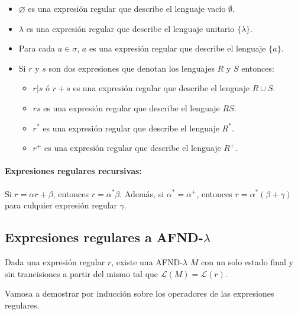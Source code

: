 \begin{itemize}
  \item \(\varnothing\) es una expresión regular que describe el lenguaje vacío \(\emptyset\).
  \item \(\lambda\) es una expresión regular que describe el lenguaje unitario \(\{\lambda\}\).
  \item Para cada \(a\in\sigma\), \(a\) es una expresión regular que describe el lenguaje \(\{a\}\).
  \item Si \(r\) y \(s\) son dos expresiones que denotan los lenguajes \(R\) y \(S\) entonces:
        \begin{itemize}
          \item \(r|s\) ó \(r+s\) es una expresión regular que describe el lenguaje \(R\cup S\).
          \item \(rs\) es una expresión regular que describe el lenguaje \(RS\).
          \item \(r^*\) es una expresión regular que describe el lenguaje \(R^*\).
          \item \(r^+\) es una expresión regular que describe el lenguaje \(R^+\).
        \end{itemize}
\end{itemize}

\paragraph{Expresiones regulares recursivas:} Si \(r=\alpha r + \beta\), entonces \(r = \alpha^* \beta\). Además, si \(\alpha^* = \alpha^+\), entonces \(r = \alpha^*(\beta + \gamma)\) para culquier expresión regular \(\gamma\).

\subsection{Expresiones regulares a AFND-\texorpdfstring{\(\lambda\)}{Lambda}}
Dada una expresión regular \(r\), existe una AFND-\(\lambda\) \(M\) con un solo estado final y sin trancisiones a partir del mismo tal que \(\mathcal{L}(M) = \mathcal{L}(r)\).

Vamosa a demostrar por inducción sobre los operadores de las expresiones regulares.

